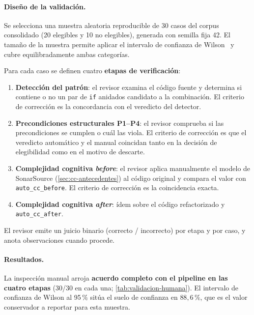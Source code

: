 \paragraph{Diseño de la validación.}
Se selecciona una muestra aleatoria reproducible de 30 casos del corpus
consolidado (20 elegibles y 10 no elegibles), generada con semilla fija 42. El tamaño de la
muestra permite aplicar el intervalo de confianza de Wilson~\cite{wilson1927}
y cubre
equilibradamente ambas categorías.

Para cada caso se definen cuatro \textbf{etapas de verificación}:
\begin{enumerate}
  \item \textbf{Detección del patrón}: el revisor examina el código fuente y
  determina si contiene o no un par de \lstinline|if| anidados candidato a la
  combinación. El criterio de corrección es la concordancia con el veredicto del
  detector.
  \item \textbf{Precondiciones estructurales P1--P4}: el revisor comprueba si las precondiciones
  se cumplen o cuál las viola. El criterio
  de corrección es que el veredicto automático y el manual coincidan tanto en la
  decisión de elegibilidad como en el motivo de descarte.
  \item \textbf{Complejidad cognitiva \emph{before}}: el revisor aplica
  manualmente el modelo de SonarSource (\autoref{sec:cc-antecedentes}) al código
  original y compara el valor con \texttt{auto\_cc\_before}. El criterio de
  corrección es la coincidencia exacta.
  \item \textbf{Complejidad cognitiva \emph{after}}: ídem sobre el código
  refactorizado y \texttt{auto\_cc\_after}.
\end{enumerate}

El revisor emite un juicio binario (correcto / incorrecto) por etapa y por caso,
y anota observaciones cuando procede.

\paragraph{Resultados.}
La inspección manual arroja \textbf{acuerdo completo con el pipeline en las
cuatro etapas} (30/30 en cada una; \autoref{tab:validacion-humana}). El
intervalo de confianza de Wilson al 95\,\% sitúa el suelo de confianza en
$88{,}6\,\%$, que es el valor conservador a reportar para esta muestra.

